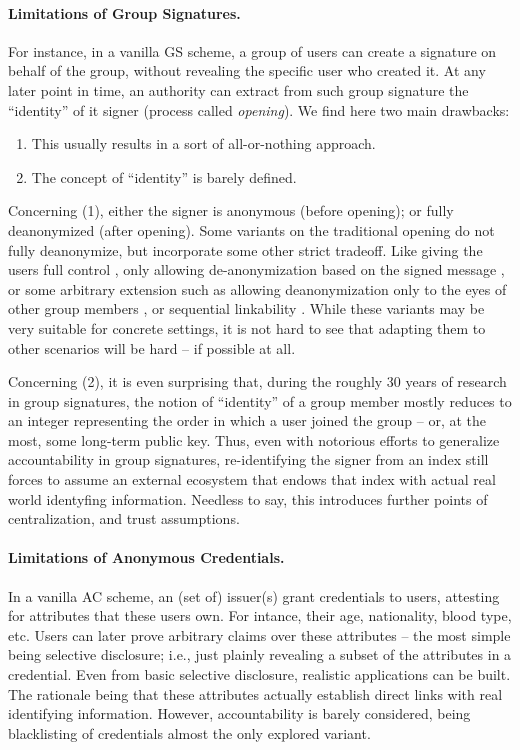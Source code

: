 \paragraph{Limitations of Group Signatures.} %
For instance, in a vanilla GS scheme, a group of users can create a signature on
behalf of the group, without revealing the specific user who created it. At any
later point in time, an authority can extract from such group signature the
``identity'' of it signer (process called \emph{opening}). We find here two main
drawbacks:

\begin{enumerate}
\item This usually results in a sort of all-or-nothing approach. 
\item The concept of ``identity'' is barely defined.
\end{enumerate}

Concerning (1), either the signer is anonymous (before opening); or fully
deanonymized (after opening). Some variants on the traditional opening do not
fully deanonymize, but incorporate some other strict tradeoff. Like giving the
users full control \cite{dl21}, only allowing de-anonymization based on the
signed message \cite{ehk+19}, or some
arbitrary extension such as allowing deanonymization only to the eyes of other
group members \cite{manu06}, or sequential linkability \cite{dl21}. While these
variants may be very suitable for concrete settings, it is not hard to see that
adapting them to other scenarios will be hard -- if possible at all.

Concerning (2), it is even surprising that, during the roughly 30 years of
research in group signatures, the notion of ``identity'' of a group member
mostly reduces to an integer representing the order in which a user joined
the group -- or, at the most, some long-term public key. Thus, even with
notorious efforts to generalize accountability in group signatures,
re-identifying the signer from an index still forces to assume an external
ecosystem that endows that index with actual real world identyfing information.
Needless to say, this introduces further points of centralization, and
trust assumptions.

\paragraph{Limitations of Anonymous Credentials.} %
In a vanilla AC scheme, an (set of) issuer(s) grant credentials to users,
attesting for attributes that these users own. For intance, their age,
nationality, blood type, etc. Users can later prove arbitrary claims over
these attributes -- the most simple being selective disclosure; i.e., just
plainly revealing a subset of the attributes in a credential. Even from basic
selective disclosure, realistic applications can be built. The rationale being
that these attributes actually establish direct links with real identifying
information. However, accountability is barely considered, being blacklisting
of credentials almost the only explored variant.

